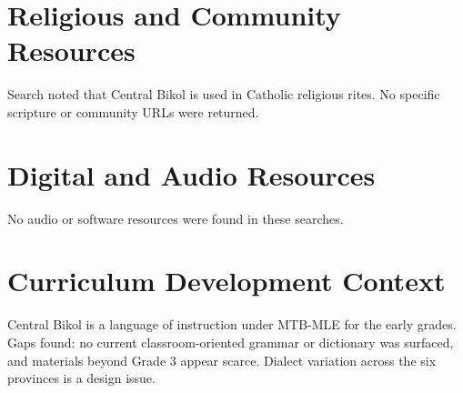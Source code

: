 \documentclass[12pt]{article}
\begin{document}
\section{Religious and Community Resources}
Search noted that Central Bikol is used in Catholic religious rites. No specific scripture or community URLs were returned.

\section{Digital and Audio Resources}
No audio or software resources were found in these searches.

\section{Curriculum Development Context}
Central Bikol is a language of instruction under MTB-MLE for the early grades. Gaps found: no current classroom-oriented grammar or dictionary was surfaced, and materials beyond Grade 3 appear scarce. Dialect variation across the six provinces is a design issue.
\end{document}
